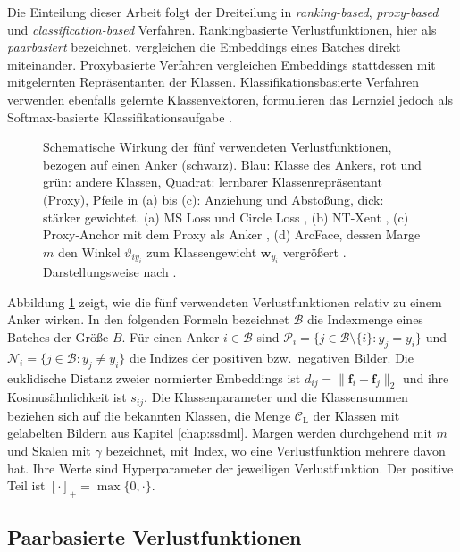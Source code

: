 Die Einteilung dieser Arbeit folgt der Dreiteilung in \emph{ranking-based}, \emph{proxy-based} und \emph{classification-based} Verfahren. Rankingbasierte Verlustfunktionen, hier als \emph{paarbasiert} bezeichnet, vergleichen die Embeddings eines Batches direkt miteinander. Proxybasierte Verfahren vergleichen Embeddings stattdessen mit mitgelernten Repräsentanten der Klassen. Klassifikationsbasierte Verfahren verwenden ebenfalls gelernte Klassenvektoren, formulieren das Lernziel jedoch als Softmax-basierte Klassifikationsaufgabe \cite{roth_revisiting_2020}. 

\begin{figure}[tbp]
  \centering
  
  \caption[Familien der verwendeten Verlustfunktionen]{Schematische Wirkung der fünf verwendeten Verlustfunktionen, bezogen auf einen Anker (schwarz). Blau: Klasse des Ankers, rot und grün: andere Klassen, Quadrat: lernbarer Klassenrepräsentant (Proxy), Pfeile in (a) bis (c): Anziehung und Abstoßung, dick: stärker gewichtet. (a) \acs{MS} Loss \cite{wang_multi-similarity_2019} und Circle Loss \cite{sun_circle_2020}, (b) \acs{NT-Xent} \cite{chen_simple_2020}, (c) Proxy-Anchor mit dem Proxy als Anker \cite{kim_proxy_2020}, (d) ArcFace, dessen Marge $m$ den Winkel $\vartheta_{iy_i}$ zum Klassengewicht $\bm{w}_{y_i}$ vergrößert \cite{deng_arcface_2018}. Darstellungsweise nach \cite{kaya_deep_2019, kim_proxy_2020}.}
  \label{fig:verluste}
\end{figure}

 Abbildung \ref{fig:verluste} zeigt, wie die fünf verwendeten Verlustfunktionen relativ zu einem Anker wirken. In den folgenden Formeln bezeichnet $\mathcal{B}$ die Indexmenge eines Batches der Größe $B$. Für einen Anker $i\in\mathcal{B}$ sind $\mathcal{P}_i=\{j\in\mathcal{B}\setminus\{i\}:y_j=y_i\}$ und $\mathcal{N}_i=\{j\in\mathcal{B}:y_j\ne y_i\}$ die Indizes der positiven bzw.\ negativen Bilder. Die euklidische Distanz zweier normierter Embeddings ist $d_{ij}=\lVert\bm{f}_i-\bm{f}_j\rVert_2$ und ihre Kosinusähnlichkeit ist $s_{ij}$. Die Klassenparameter und die Klassensummen beziehen sich auf die bekannten Klassen, die Menge $\mathcal{C}_{\mathrm{L}}$ der Klassen mit gelabelten Bildern aus Kapitel \ref{chap:ssdml}. Margen werden durchgehend mit $m$ und Skalen mit $\gamma$ bezeichnet, mit Index, wo eine Verlustfunktion mehrere davon hat. Ihre Werte sind Hyperparameter der jeweiligen Verlustfunktion. Der positive Teil ist $[\cdot]_+=\max\{0,\cdot\}$.

\subsection{Paarbasierte Verlustfunktionen}
\label{sec:verluste:paare}

